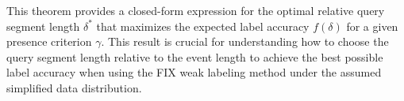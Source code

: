 This theorem provides a closed-form expression for the optimal relative query segment length $\delta^*$ that maximizes the expected label accuracy $f(\delta)$ for a given presence criterion $\gamma$. This result is crucial for understanding how to choose the query segment length relative to the event length to achieve the best possible label accuracy when using the FIX weak labeling method under the assumed simplified data distribution.
